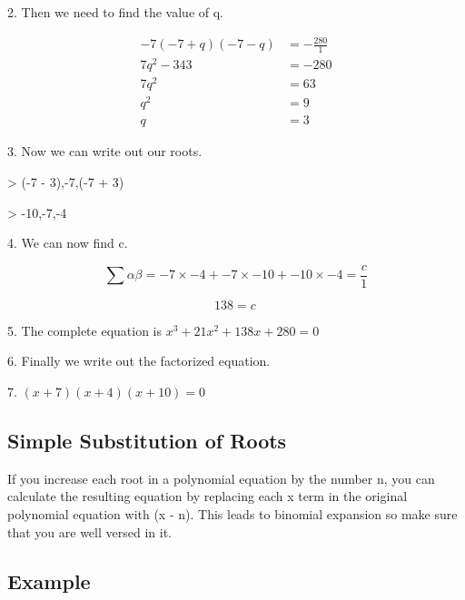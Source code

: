 2.  Then we need to find the value of q.

\begin{align} -7(-7+q)(-7-q) & = -\frac{280}{1} \\  7q^2 - 343 & = -280 \\  7q^2 & = 63 \\  q^2 & = 9 \\  q & = 3 \end{align}

3.  Now we can write out our roots.



> (-7 - 3),-7,(-7 + 3)

> -10,-7,-4



4.  We can now find c.

    $$\sum\alpha\beta = -7\times-4 + -7\times-10 + -10\times-4 = \frac{c}{1}$$



    $$138 = c\,$$

5.  The complete equation is $x^3 + 21x^2 + 138x + 280=0$

6.  Finally we write out the factorized equation.

7.  $(x + 7)(x+4)(x+10)=0\,$




\subsection{Simple Substitution of Roots}
\label{sss:simp-9731}




If you increase each root in a polynomial equation by the number n, you can calculate the
resulting equation by replacing each x term in the original polynomial equation with (x -
n). This leads to binomial expansion so make sure that you are well versed in it.




\subsection{Example}
\label{sss:exam-1a79}




